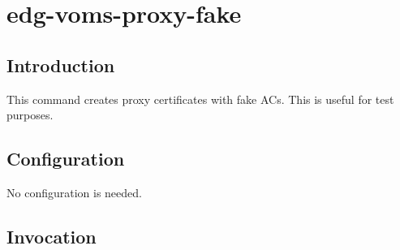 \documentclass[a4paper]{book}
\begin{document}
\chapter{edg-voms-proxy-fake}
\section{Introduction}
This command creates proxy certificates with fake ACs.  This is useful for test
purposes.

\section{Configuration}
No configuration is needed.

\section{Invocation}
\end{document}
